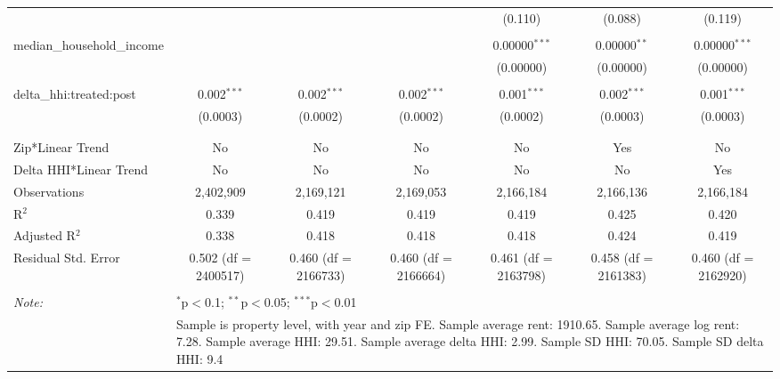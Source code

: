 \begin{table}[H]
{\begin{tabular}{@{\extracolsep{5pt}}lcccccc}
   &  &  &  & (0.110) & (0.088) & (0.119) \\  

   & & & & & & \\  

  median\_household\_income &  &  &  & 0.00000$^{***}$ & 0.00000$^{**}$ & 0.00000$^{***}$ \\  

   &  &  &  & (0.00000) & (0.00000) & (0.00000) \\  

   & & & & & & \\  

  delta\_hhi:treated:post & 0.002$^{***}$ & 0.002$^{***}$ & 0.002$^{***}$ & 0.001$^{***}$ & 0.002$^{***}$ & 0.001$^{***}$ \\  

   & (0.0003) & (0.0002) & (0.0002) & (0.0002) & (0.0003) & (0.0003) \\  

   & & & & & & \\  

 \hline \\[-1.8ex]  

 Zip*Linear Trend & No & No & No & No & Yes & No \\  

 Delta HHI*Linear Trend & No & No & No & No & No & Yes \\  

 Observations & 2,402,909 & 2,169,121 & 2,169,053 & 2,166,184 & 2,166,136 & 2,166,184 \\  

 R$^{2}$ & 0.339 & 0.419 & 0.419 & 0.419 & 0.425 & 0.420 \\  

 Adjusted R$^{2}$ & 0.338 & 0.418 & 0.418 & 0.418 & 0.424 & 0.419 \\  

 Residual Std. Error & 0.502 (df = 2400517) & 0.460 (df = 2166733) & 0.460 (df = 2166664) & 0.461 (df = 2163798) & 0.458 (df = 2161383) & 0.460 (df = 2162920) \\  

 \hline  

 \hline \\[-1.8ex]  

 \textit{Note:}  & \multicolumn{6}{l}{$^{*}$p$<$0.1; $^{**}$p$<$0.05; $^{***}$p$<$0.01} \\  

  & \multicolumn{6}{l}{Sample is property level, with year and zip FE. Sample average rent: 1910.65. Sample average log rent: 7.28. Sample average HHI: 29.51. Sample average delta HHI: 2.99. Sample SD HHI: 70.05. Sample SD delta HHI: 9.4} \\  

 \end{tabular}}  

 \end{table}  

